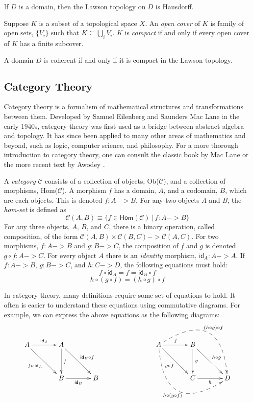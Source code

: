 \begin{proposition}
If $D$ is a domain, then the Lawson topology on $D$ is Hausdorff.
\end{proposition}

\begin{definition}
Suppose $K$ is a subset of a topological space $X$.  An \emph{open cover} of $K$ is family of open sets, $\{V_i\}$ such that $K\subseteq \bigcup_i V_i$.  $K$ is \emph{compact} if and only if every open cover of $K$ has a finite subcover.
\end{definition}

\begin{proposition}
A domain $D$ is coherent if and only if it is compact in the Lawson topology.
\end{proposition}

\subsection{Category Theory}

Category theory is a formalism of mathematical structures and transformations between them.  Developed by Samuel Eilenberg and Saunders Mac Lane in the early 1940s, category theory was first used as a bridge between abstract algebra and topology.  It has since been applied to many other areas of mathematics and beyond, such as logic, computer science, and philosophy.  For a more thorough introduction to category theory, one can consult the classic book by Mac Lane \cite{mac1998categories} or the more recent text by Awodey \cite{awodey2010category}.

\begin{definition}
A \emph{category} $\mathcal{C}$ consists of a collection of objects, \textsf{Ob}($\mathcal{C}$), and a collection of morphisms, \textsf{Hom}($\mathcal{C}$).  A morphism $f$ has a domain, $A$, and a codomain, $B$, which are each objects.  This is denoted $f:A->B$.  For any two objects $A$ and $B$, the \emph{hom-set} is defined as
\[\mathcal{C}(A,B) \equiv \{f\in \textsf{Hom}(\mathcal{C})\ |\ f:A->B\}\]
For any three objects, $A$, $B$, and $C$, there is a binary operation, called composition, of the form $\mathcal{C}(A,B) \times \mathcal{C}(B,C) -> \mathcal{C}(A,C)$.  For two morphisms, $f:A->B$ and $g:B->C$, the composition of $f$ and $g$ is denoted $g\circ f:A->C$.  For every object $A$ there is an \emph{identity} morphism, $\textsf{id}_A:A->A$. If $f:A->B$, $g:B->C$, and $h:C->D$,  the following equations must hold:
\[f\circ \textsf{id}_A = f = \textsf{id}_B \circ f\]
\[h\circ (g\circ f) = (h\circ g) \circ f\]
\end{definition}
In category theory, many definitions require some set of equations to hold.  It often is easier to understand these equations using commutative diagrams.  For example, we can express the above equations as the following diagrams:
\[
\xymatrix@+1pc{
A\ar[r]^{\textsf{id}_A}\ar[dr]_{f\circ\,\textsf{id}_A} & A \ar[d]^{f}\ar[dr]^{\textsf{id}_B\circ f} & & & A\ar[r]^{f}\ar[dr]_{g\circ f}\ar@{-->}@/^4pc/[drr]^{(h\circ g)\circ f}\ar@{-->}@/_4pc/[drr]_{h\circ(g\circ f)} & B\ar[d]^{g}\ar[dr]^{h\circ g} \\
  & B\ar[r]_{\textsf{id}_B} & B & & & C\ar[r]_{h} & D
}
\]

